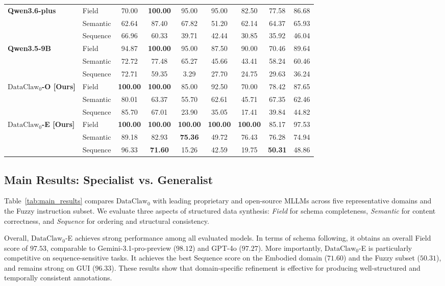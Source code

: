 \begin{table}[t]
{\begin{tabular}{llccccccc}
\midrule
\multirow{3}{*}{\textbf{Qwen3.6-plus}} 
& Field       & 70.00 & \textbf{100.00} & 95.00 & 95.00 & 82.50 & 77.58 & 86.68 \\
& Semantic    & 62.64 & 87.40 & 67.82 & 51.20 & 62.14 & 64.37 & 65.93 \\
& Sequence    & 66.96 & 60.33 & 39.71 & 42.44 & 30.85 & 35.92 & 46.04 \\
\midrule
\multirow{3}{*}{\textbf{Qwen3.5-9B}} 
& Field       & 94.87 & \textbf{100.00} & 95.00 & 87.50 & 90.00 & 70.46 & 89.64 \\
& Semantic    & 72.72 & 77.48 & 65.27 & 45.66 & 43.41 & 58.24 & 60.46 \\
& Sequence    & 72.71 & 59.35 & 3.29 & 27.70 & 24.75 & 29.63 & 36.24 \\
\midrule
\multirow{3}{*}{\textbf{$\text{DataClaw}_0$-O [Ours]}} 
& Field       & \textbf{100.00} & \textbf{100.00} & 85.00 & 92.50 & 70.00 & 78.42 & 87.65 \\
& Semantic    & 80.01 & 63.37 & 55.70 & 62.61 & 45.71 & 67.35 & 62.46 \\
& Sequence    & 85.70 & 67.01 & 23.90 & 35.05 & 17.41 & 39.84 & 44.82 \\
\midrule
\multirow{3}{*}{\textbf{$\text{DataClaw}_0$-E [Ours]}} 
& Field       & \textbf{100.00} & \textbf{100.00} & \textbf{100.00} & \textbf{100.00} & \textbf{100.00} & 85.17 & 97.53 \\
& Semantic    & 89.18 & 82.93 & \textbf{75.36} & 49.72 & 76.43 & 76.28 & 74.94 \\
& Sequence    & 96.33 & \textbf{71.60} & 15.26 & 42.59 & 19.75 & \textbf{50.31} & 48.86 \\
\bottomrule
\end{tabular}
}
\end{table}


\subsection{Main Results: Specialist vs. Generalist}
\label{subsec:main_results}

Table~\ref{tab:main_results} compares $\text{DataClaw}_0$ with leading proprietary and open-source MLLMs across five representative domains and the Fuzzy instruction subset. We evaluate three aspects of structured data synthesis: \textit{Field} for schema completeness, \textit{Semantic} for content correctness, and \textit{Sequence} for ordering and structural consistency.

Overall, $\text{DataClaw}_0$-E achieves strong performance among all evaluated models. In terms of schema following, it obtains an overall Field score of \(97.53\), comparable to Gemini-3.1-pro-preview (\(98.12\)) and GPT-4o (\(97.27\)). More importantly, $\text{DataClaw}_0$-E is particularly competitive on sequence-sensitive tasks. It achieves the best Sequence score on the Embodied domain (\(71.60\)) and the Fuzzy subset (\(50.31\)), and remains strong on GUI (\(96.33\)). These results show that domain-specific refinement is effective for producing well-structured and temporally consistent annotations.

